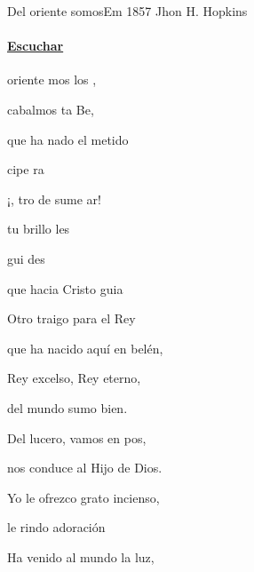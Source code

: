 \documentclass[12pt, spanish]{book}
\begin{document}
    \begin{song}{Del oriente somos}{Em}
    {1857} %
    {Jhon H. Hopkins}
    {} %
    {}
        \ifChordBk
            \paragraph{\mbox{}\hfill\protect\href{https://open.spotify.com/intl-es/track/4WqAmY5Sis1mkuGVP24TBA}{Escuchar}\mbox{}\hfill}
        \fi

        \begin{SBOpGroup}
             oriente mos los ,

            cabalmos ta Be,

            que ha nado el metido

            cipe  ra
        \end{SBOpGroup}

        \begin{SBChorus}
            ¡, tro de sume ar!

             tu brillo les

            gui  des

            que hacia Cristo  guia
        \end{SBChorus}

        \begin{SBOpGroup}
            Otro traigo para el Rey

            que ha nacido aquí en belén,

            Rey excelso, Rey eterno,

            del mundo sumo bien.
        \end{SBOpGroup}

        \begin{SBOpGroup}
            Del lucero, vamos en pos,

            nos conduce al Hijo de Dios.

            Yo le ofrezco grato incienso,

            le rindo adoración
        \end{SBOpGroup}

        \begin{SBOpGroup}
            Ha venido al mundo la luz,


\end{SBOpGroup}
\end{song}
\end{document}
